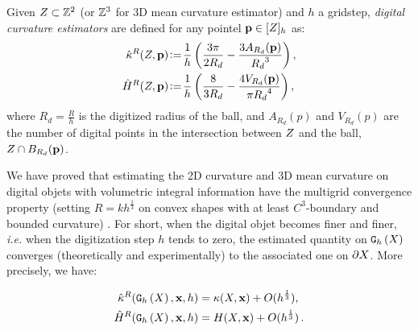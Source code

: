 \documentclass{llncs}
\newcommand{\ie}{\emph{i.e.} }
\begin{document}
\begin{Definition}
  Given $Z \subset {\mathbb{Z}}^2$ (or ${\mathbb{Z}}^3$ for 3D mean curvature estimator) and
  $h$ a gridstep, {\em digital curvature estimators} are defined for any pointel
  $\mathbf{p} \in \lbrack Z \rbrack_{h}$ as:
  \begin{align}
   \hat{\kappa}^{R}(Z,\mathbf{p}) &\!\mathrel{\mathop:}=\! \frac{1}{h} \left( \frac{3 \pi}{2 R_d} - \frac{3 A_{R_d}(\mathbf{p})}{{R_d}^3} \right),\label{eq:dig-curvature-estimator-k}\\
   \hat{H}^{R}(Z,\mathbf{p}) &\!\mathrel{\mathop:}=\! \frac{1}{h} \left( \frac{8}{3 R_d} - \frac{4V_{R_d}(\mathbf{p})}{{\pi R_d}^4} \right),\label{eq:dig-curvature-estimator-H}
  \end{align}
  where $R_d = \frac{R}{h}$ is the digitized radius of the ball, and
  $A_{R_d}(p)$ and $V_{R_d}(p)$ are the number of digital points in the
  intersection between $Z$ and the ball, $Z\cap B_{R_d}(\mathbf{p})$.
\end{Definition}

We have proved that estimating the 2D curvature and 3D mean curvature on digital
objets with volumetric integral information have the multigrid convergence
property (setting $R = kh^\frac{1}{3}$ on convex shapes with at least
$C^3$-boundary and bounded curvature) \cite{CVIU2014}. For short, when the digital objet becomes
finer and finer, \ie when the digitization step $h$ tends to zero, the estimated
quantity on $\mathtt{G}_{h}\left(X\right)$  converges (theoretically and experimentally) to
the associated one on $\partial X$. More precisely, we have:

\begin{align}
  \hat{\kappa}^{R}(\mathtt{G}_{h}\left(X\right),\mathbf{x},h) &= \kappa(X,\mathbf{x}) + O(h^{\frac{1}{3}}),\\
  \hat{H}^{R}(\mathtt{G}_{h}\left(X\right),\mathbf{x},h) &= H(X,\mathbf{x}) + O(h^{\frac{1}{3}}) \,.
\end{align}
\end{document}
